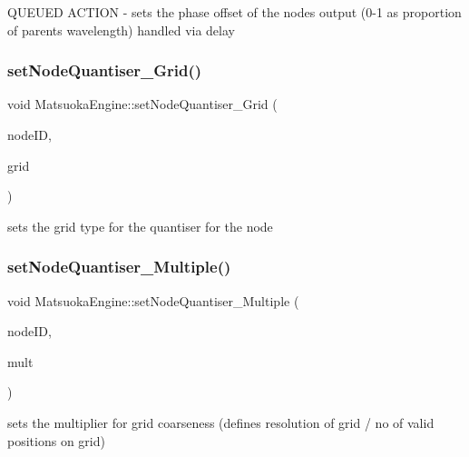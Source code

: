 Q\+U\+E\+U\+ED A\+C\+T\+I\+ON -\/ sets the phase offset of the node\textquotesingle{}s output (0-\/1 as proportion of parent\textquotesingle{}s wavelength) handled via delay \mbox{\label{classMatsuokaEngine_aeb46c52bb2a430616aea63732aba7e32}} 
\subsubsection{\texorpdfstring{set\+Node\+Quantiser\+\_\+\+Grid()}{setNodeQuantiser\_Grid()}}
{\footnotesize\ttfamily void Matsuoka\+Engine\+::set\+Node\+Quantiser\+\_\+\+Grid (\begin{DoxyParamCaption}\item[{unsigned}]{node\+ID,  }\item[{\mbox{\hyperlink{classQuantisedEventQueue_ae186d50bd503038452edbbdd0c7c259e}{grid\+Type}}}]{grid }\end{DoxyParamCaption})}



sets the grid type for the quantiser for the node 

\mbox{\label{classMatsuokaEngine_a1220a5a72f9bf35a9e6cd5a4f999f7e5}} 
\subsubsection{\texorpdfstring{set\+Node\+Quantiser\+\_\+\+Multiple()}{setNodeQuantiser\_Multiple()}}
{\footnotesize\ttfamily void Matsuoka\+Engine\+::set\+Node\+Quantiser\+\_\+\+Multiple (\begin{DoxyParamCaption}\item[{unsigned}]{node\+ID,  }\item[{float}]{mult }\end{DoxyParamCaption})}



sets the multiplier for grid coarseness (defines resolution of grid / no of valid positions on grid) 

